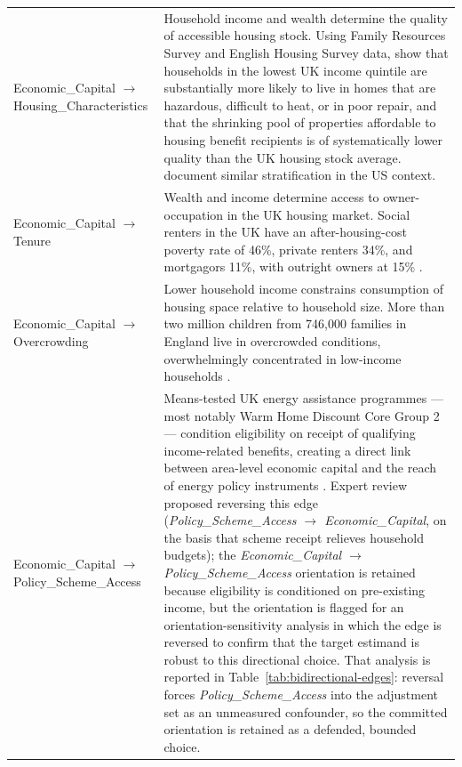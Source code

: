 \begin{longtable}{@{}p{3.8cm}p{11.2cm}@{}}
\addlinespace
Economic\_Capital $\to$ Housing\_Characteristics & Household income and wealth determine the quality of accessible housing stock. Using Family Resources Survey and English Housing Survey data, \citet{waters_housing_2023} show that households in the lowest UK income quintile are substantially more likely to live in homes that are hazardous, difficult to heat, or in poor repair, and that the shrinking pool of properties affordable to housing benefit recipients is of systematically lower quality than the UK housing stock average. \citet{garrison_housing_2025} document similar stratification in the US context. \\
\addlinespace
Economic\_Capital $\to$ Tenure & Wealth and income determine access to owner-occupation in the UK housing market. Social renters in the UK have an after-housing-cost poverty rate of 46\%, private renters 34\%, and mortgagors 11\%, with outright owners at 15\% \citep{waters_housing_2023}. \\
\addlinespace
Economic\_Capital $\to$ Overcrowding & Lower household income constrains consumption of housing space relative to household size. More than two million children from 746,000 families in England live in overcrowded conditions, overwhelmingly concentrated in low-income households \citep{national_housing_federation_overcrowding_2023}. \\
\addlinespace
Economic\_Capital $\to$ Policy\_Scheme\_Access & Means-tested UK energy assistance programmes — most notably Warm Home Discount Core Group 2 — condition eligibility on receipt of qualifying income-related benefits, creating a direct link between area-level economic capital and the reach of energy policy instruments \citep{department_for_energy_security_and_net_zero_warm_2025, department_for_energy_security_and_net_zero_annual_2024}. Expert review proposed reversing this edge (\textit{Policy\_Scheme\_Access $\to$ Economic\_Capital}, on the basis that scheme receipt relieves household budgets); the \textit{Economic\_Capital $\to$ Policy\_Scheme\_Access} orientation is retained because eligibility is conditioned on pre-existing income, but the orientation is flagged for an orientation-sensitivity analysis in which the edge is reversed to confirm that the target estimand is robust to this directional choice. That analysis is reported in Table~\ref{tab:bidirectional-edges}: reversal forces \textit{Policy\_Scheme\_Access} into the adjustment set as an unmeasured confounder, so the committed orientation is retained as a defended, bounded choice. \\

\end{longtable}
